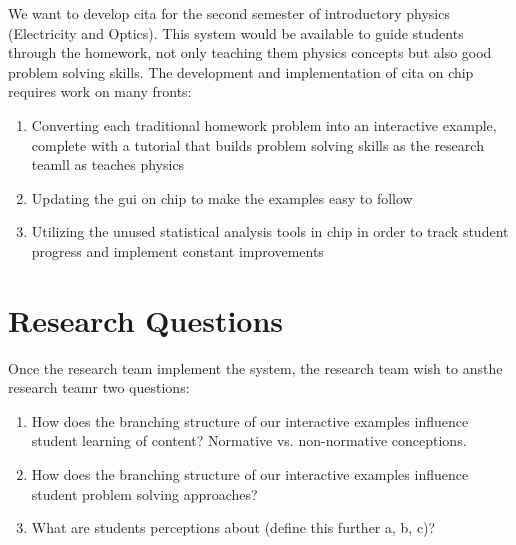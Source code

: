 We want to develop \gls{cita} for the second semester of introductory physics (Electricity and Optics). This system would be available to guide students through the homework, not only teaching them physics concepts but also good problem solving skills. The development and implementation of \gls{cita} on \gls{chip} requires work on many fronts:

\begin{enumerate}
\item Converting each traditional homework problem into an interactive example, complete with a tutorial that builds problem solving skills as the research teamll as teaches physics
\item Updating the \gls{gui} on \gls{chip} to make the examples easy to follow
\item Utilizing the unused statistical analysis tools in \gls{chip} in order to track student progress and implement constant improvements
\end{enumerate}

\section{Research Questions}

Once the research team implement the system, the research team wish to ansthe research teamr two questions:

\begin{enumerate}
\item How does the branching structure of our interactive examples influence student learning of content? Normative vs. non-normative conceptions.
\item How does the branching structure of our interactive examples influence student problem solving approaches?
\item What are students perceptions about (define this further a, b, c)?
\end{enumerate}
